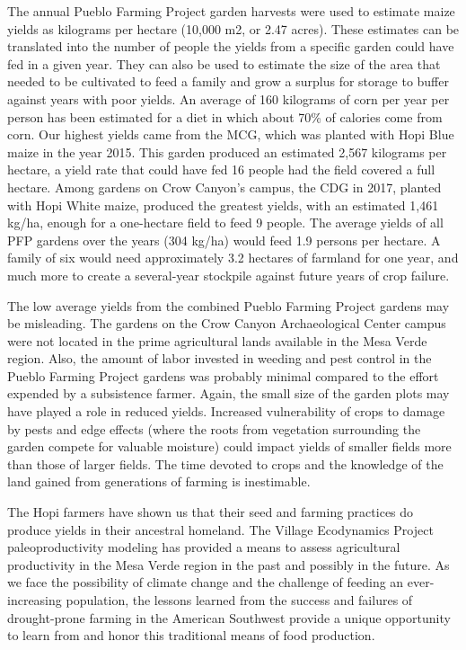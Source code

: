 \documentclass[12pt,]{article}
\begin{document}
The annual Pueblo Farming Project garden harvests were used to estimate maize yields as kilograms per hectare (10,000 m2, or 2.47 acres). These estimates can be translated into the number of people the yields from a specific garden could have fed in a given year. They can also be used to estimate the size of the area that needed to be cultivated to feed a family and grow a surplus for storage to buffer against years with poor yields. An average of 160 kilograms of corn per year per person has been estimated for a diet in which about 70\% of calories come from corn. Our highest yields came from the MCG, which was planted with Hopi Blue maize in the year 2015. This garden produced an estimated 2,567 kilograms per hectare, a yield rate that could have fed 16 people had the field covered a full hectare. Among gardens on Crow Canyon's campus, the CDG in 2017, planted with Hopi White maize, produced the greatest yields, with an estimated 1,461 kg/ha, enough for a one-hectare field to feed 9 people. The average yields of all PFP gardens over the years (304 kg/ha) would feed 1.9 persons per hectare. A family of six would need approximately 3.2 hectares of farmland for one year, and much more to create a several-year stockpile against future years of crop failure.

The low average yields from the combined Pueblo Farming Project gardens may be misleading. The gardens on the Crow Canyon Archaeological Center campus were not located in the prime agricultural lands available in the Mesa Verde region. Also, the amount of labor invested in weeding and pest control in the Pueblo Farming Project gardens was probably minimal compared to the effort expended by a subsistence farmer. Again, the small size of the garden plots may have played a role in reduced yields. Increased vulnerability of crops to damage by pests and edge effects (where the roots from vegetation surrounding the garden compete for valuable moisture) could impact yields of smaller fields more than those of larger fields. The time devoted to crops and the knowledge of the land gained from generations of farming is inestimable.

The Hopi farmers have shown us that their seed and farming practices do produce yields in their ancestral homeland. The Village Ecodynamics Project paleoproductivity modeling has provided a means to assess agricultural productivity in the Mesa Verde region in the past and possibly in the future. As we face the possibility of climate change and the challenge of feeding an ever-increasing population, the lessons learned from the success and failures of drought-prone farming in the American Southwest provide a unique opportunity to learn from and honor this traditional means of food production.
\end{document}
